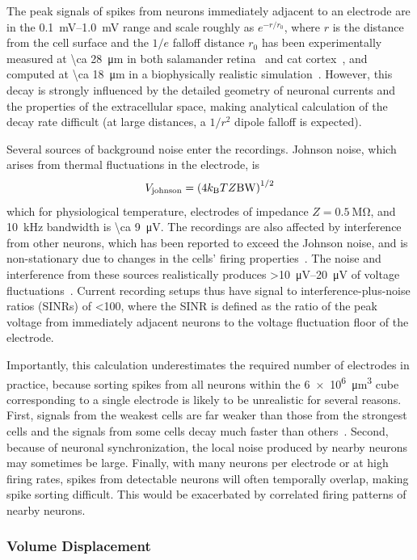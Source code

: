 The peak signals of spikes from neurons immediately adjacent to an electrode are in the \SIrange{0.1}{1.0}{\milli\volt} range and scale roughly as $e^{-r/r_0}$, where $r$ is the distance from the cell surface and the $1/e$ falloff distance $r_0$ has been experimentally measured at \SI{\ca 28}{\micro\meter} in both salamander retina~\cite{segev04} and cat cortex~\cite{gray95}, and computed at \SI{\ca 18}{\micro\meter} in a biophysically realistic simulation~\cite{gold07}.
However, this decay is strongly influenced by the detailed geometry of neuronal currents and the properties of the extracellular space, making analytical calculation of the decay rate difficult (at large distances, a $1/r^2$ dipole falloff is expected).

Several sources of background noise enter the recordings.
Johnson noise, which arises from thermal fluctuations in the electrode, is \[V_{\text{\scriptsize johnson}} = \left(4k_{\text{\scriptsize B}} T Z \text{BW}\right)^{1/2}\]
which for physiological temperature, electrodes of impedance $Z = \SI{0.5}{\mega\ohm}$, and \SI{10}{\kilo\hertz} bandwidth is \SI{\ca 9}{\micro\volt}.
The recordings are also affected by interference from other neurons, which has been reported to exceed the Johnson noise, and is non-stationary due to changes in the cells' firing properties~\cite{sahani99}. 
The noise and interference from these sources realistically produces \SIrange{>10}{20}{\micro\volt} of voltage fluctuations~\cite{camunas13}.
Current recording setups thus have signal to interference-plus-noise ratios (SINRs) of \num{<100}, where the SINR is defined as the ratio of the peak voltage from immediately adjacent neurons to the voltage fluctuation floor of the electrode.

Importantly, this calculation underestimates the required number of electrodes in practice, because sorting spikes from all neurons within the \SI{6e6}{\micro\meter\cubed} cube corresponding to a single electrode is likely to be unrealistic for several reasons.
First, signals from the weakest cells are far weaker than those from the strongest cells and the signals from some cells decay much faster than others~\cite{gray95}.
Second, because of neuronal synchronization, the local noise produced by nearby neurons may sometimes be large. 
Finally, with many neurons per electrode or at high firing rates, spikes from detectable neurons will often temporally overlap, making spike sorting difficult.
This would be exacerbated by correlated firing patterns of nearby neurons.

\subsubsection{Volume Displacement}

